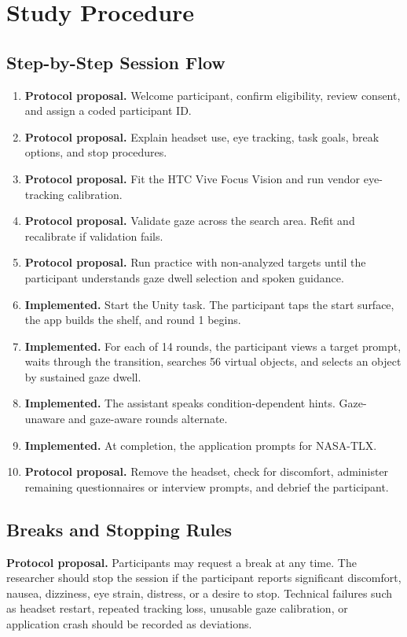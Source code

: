 \documentclass[11pt,letterpaper]{article}
\newcommand{\status}[1]{\textbf{#1.}}
\begin{document}
\section{Study Procedure}

\subsection{Step-by-Step Session Flow}

\begin{enumerate}
  \item \status{Protocol proposal} Welcome participant, confirm eligibility, review consent, and assign a coded participant ID.
  \item \status{Protocol proposal} Explain headset use, eye tracking, task goals, break options, and stop procedures.
  \item \status{Protocol proposal} Fit the HTC Vive Focus Vision and run vendor eye-tracking calibration.
  \item \status{Protocol proposal} Validate gaze across the search area. Refit and recalibrate if validation fails.
  \item \status{Protocol proposal} Run practice with non-analyzed targets until the participant understands gaze dwell selection and spoken guidance.
  \item \status{Implemented} Start the Unity task. The participant taps the start surface, the app builds the shelf, and round 1 begins.
  \item \status{Implemented} For each of 14 rounds, the participant views a target prompt, waits through the transition, searches 56 virtual objects, and selects an object by sustained gaze dwell.
  \item \status{Implemented} The assistant speaks condition-dependent hints. Gaze-unaware and gaze-aware rounds alternate.
  \item \status{Implemented} At completion, the application prompts for NASA-TLX.
  \item \status{Protocol proposal} Remove the headset, check for discomfort, administer remaining questionnaires or interview prompts, and debrief the participant.
\end{enumerate}

\subsection{Breaks and Stopping Rules}

\status{Protocol proposal} Participants may request a break at any time. The researcher should stop the session if the participant reports significant discomfort, nausea, dizziness, eye strain, distress, or a desire to stop. Technical failures such as headset restart, repeated tracking loss, unusable gaze calibration, or application crash should be recorded as deviations.
\end{document}
